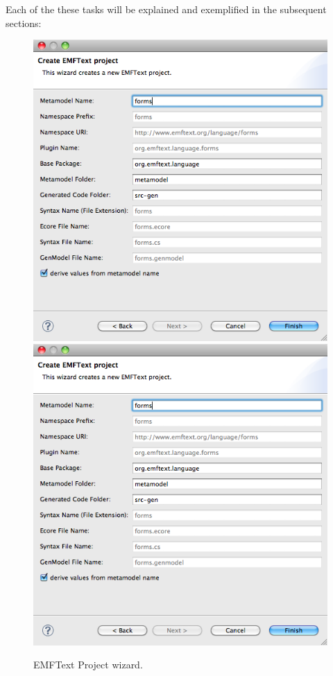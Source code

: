 	
	
	Each of the these tasks
	will be explained and exemplified in the subsequent sections:
	
	\begin{figure}[ht]
	\centering
	\ifpdf
		\includegraphics[scale=0.5]{figures/wizard}
	\else
		\includegraphics{figures/wizard.png}
	\fi
	\caption{EMFText Project wizard.}
	\label{fig:wizard}
	\end{figure}

